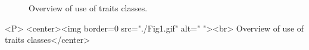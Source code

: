 \begin{ccTexOnly}

\begin{figure} [t]
  \begin{center}
  \leavevmode
  \vspace*{6cm}
  \hspace*{-2cm}
  \end{center}
  \vspace*{-8cm}
  \caption{Overview of use of traits classes.}
  \label{ASPAS:Fig1}
\end{figure}

\end{ccTexOnly}

\lcHtml{\label{ASPAS:Fig1}}
\begin{ccHtmlOnly}
<P>
<center><img border=0 src="./Fig1.gif" alt=" "><br>
Overview of use of traits classes</center>
\end{ccHtmlOnly}










